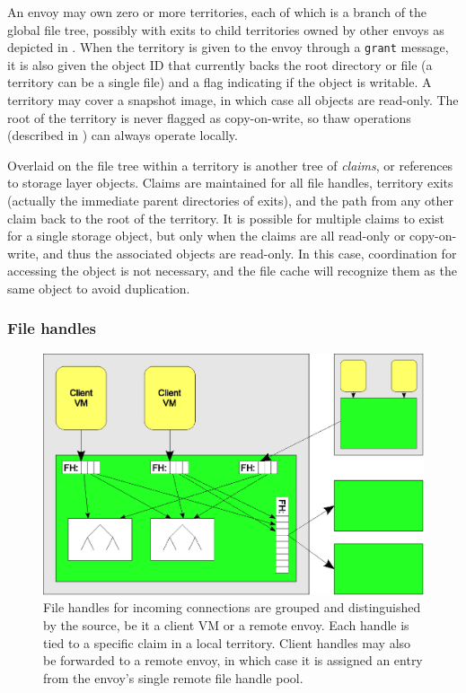 An envoy may own zero or more territories, each of which is a branch of the global file tree, possibly with exits to child territories owned by other envoys as depicted in . When the territory is given to the envoy through a \texttt{grant} message, it is also given the object ID that currently backs the root directory or file (a territory can be a single file) and a flag indicating if the object is writable. A territory may cover a snapshot image, in which case all objects are read-only. The root of the territory is never flagged as copy-on-write, so thaw operations (described in ) can always operate locally.

Overlaid on the file tree within a territory is another tree of \emph{claims}, or references to storage layer objects. Claims are maintained for all file handles, territory exits (actually the immediate parent directories of exits), and the path from any other claim back to the root of the territory. It is possible for multiple claims to exist for a single storage object, but only when the claims are all read-only or copy-on-write, and thus the associated objects are read-only. In this case, coordination for accessing the object is not necessary, and the file cache will recognize them as the same object to avoid duplication.

\subsubsection{File handles}

\begin{figure}[tp]
\centering
\includegraphics[width=\figwidth]{figures/file-handles}
\caption[Managing file handles in local and remote envoys]{File handles for incoming connections are grouped and distinguished by the source, be it a client VM or a remote envoy. Each handle is tied to a specific claim in a local territory. Client handles may also be forwarded to a remote envoy, in which case it is assigned an entry from the envoy's single remote file handle pool.}
\label{fig:file-handles}
\end{figure}

